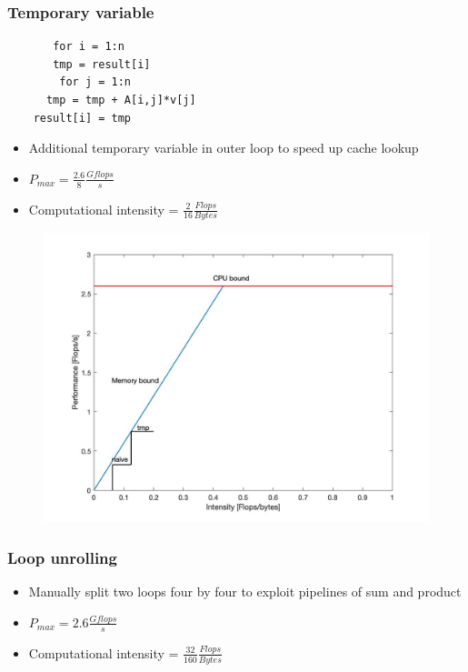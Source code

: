 \documentclass{beamer}
\begin{document}
\begin{frame}[fragile]
\frametitle{Temporary variable}
\begin{center}
\begin{lstlisting}
       for i = 1:n
       tmp = result[i]
       	for j = 1:n 
	  tmp = tmp + A[i,j]*v[j]
	result[i] = tmp
\end{lstlisting}
\end{center}
\begin{itemize}
\item Additional temporary variable in outer loop to speed up cache lookup
\item  $P_{max} = \frac{2.6}{8}\frac{Gflops}{s}$
\item Computational intensity = $\frac{2}{16}\frac{Flops}{Bytes}$
\end{itemize}
\end{frame}
\begin{frame}
\begin{figure}
\includegraphics[scale=0.25]{roof_tmp}
\end{figure}
\end{frame}
\begin{frame}
\frametitle{Loop unrolling}
\begin{itemize}
\item Manually split two loops four by four to exploit pipelines of sum and product
\item $P_{max} =2.6\frac{Gflops}{s}$ 
\item Computational intensity = $\frac{32}{160}\frac{Flops}{Bytes}$
\end{itemize}
\end{frame}
\end{document}
